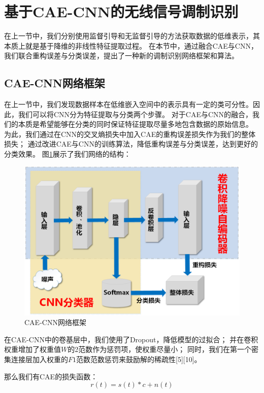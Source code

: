 \section{基于CAE-CNN的无线信号调制识别}

在上一节中，我们分别使用监督引导和无监督引导的方法获取数据的低维表示，其本质上就是基于降维的非线性特征提取过程。
在本节中，通过融合CAE与CNN，我们联合重构误差与分类误差，提出了一种新的调制识别网络框架和算法。

\subsection{CAE-CNN网络框架}
在上一节中，我们发现数据样本在低维嵌入空间中的表示具有一定的类可分性。因此，我们可以将CNN分为特征提取与分类两个步骤。
对于CAE与CNN的融合，我们的本质是希望能够在分类的同时保证特征提取尽量多地包含数据的原始信息。
为此，我们通过在CNN的交叉熵损失中加入CAE的重构误差损失作为我们的整体损失；
通过改进CAE与CNN的训练算法，降低重构误差与分类误差，达到更好的分类效果。
图\ref{sec:fig_3_8}展示了我们网络的结构：

\begin{figure}[!h]
	\centering
	\includegraphics[scale=0.5]{figures/chapter_3/fig_3_8}
	\caption{CAE-CNN网络框架}	\label{sec:fig_3_8}
\end{figure}

在CAE-CNN中的卷基层中，我们使用了Dropout，降低模型的过拟合；
并在卷积权重增加了权重值$W$的2范数作为惩罚项，使权重尽量小；
同时，我们在第一个密集连接层加入权重的$F1$范数范数惩罚来鼓励解的稀疏性[5][10]。\par

那么我们有CAE的损失函数：
\begin{equation}\label{sec:eqt3_3}
r(t) = s(t)*c + n(t)
\end{equation}

